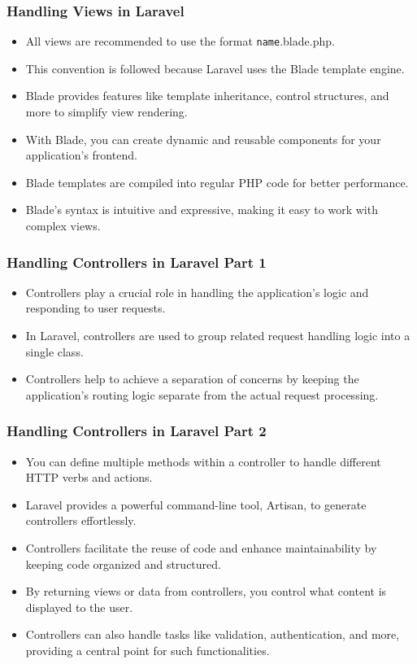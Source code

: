 \documentclass[aspectratio=169, table]{beamer}
\begin{document}
\begin{frame}[fragile]
    \frametitle{Handling Views in Laravel}
    \begin{itemize}
        \item All views are recommended to use the format \texttt{{name}}.blade.php.
        \item This convention is followed because Laravel uses the Blade template engine.
        \item Blade provides features like template inheritance, control structures, and more to simplify view rendering.
        \item With Blade, you can create dynamic and reusable components for your application's frontend.
        \item Blade templates are compiled into regular PHP code for better performance.
        \item Blade's syntax is intuitive and expressive, making it easy to work with complex views.
    \end{itemize}
\end{frame}

\begin{frame}[fragile]
    \frametitle{Handling Controllers in Laravel Part 1}
    \vspace{5mm}
    \begin{itemize}
        \item Controllers play a crucial role in handling the application's logic and responding to user requests.
        \item In Laravel, controllers are used to group related request handling logic into a single class.
        \item Controllers help to achieve a separation of concerns by keeping the application's routing logic separate from the actual request processing.
    \end{itemize}
\end{frame}

\begin{frame}[fragile]
    \frametitle{Handling Controllers in Laravel Part 2}
    \vspace{5mm}
    \begin{itemize}
        \item You can define multiple methods within a controller to handle different HTTP verbs and actions.
        \item Laravel provides a powerful command-line tool, Artisan, to generate controllers effortlessly.
        \item Controllers facilitate the reuse of code and enhance maintainability by keeping code organized and structured.
        \item By returning views or data from controllers, you control what content is displayed to the user.
        \item Controllers can also handle tasks like validation, authentication, and more, providing a central point for such functionalities.
    \end{itemize}
\end{frame}
\end{document}
